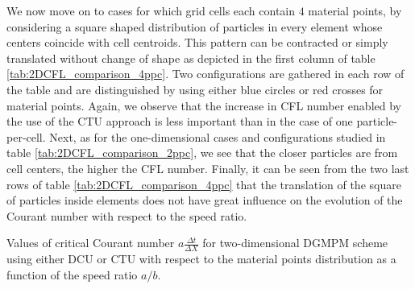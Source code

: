 We now move on to cases for which grid cells each contain $4$ material points, by considering a square shaped distribution of particles in every element whose centers coincide with cell centroids.
This pattern can be contracted or simply translated without change of shape as depicted in the first column of table \ref{tab:2DCFL_comparison_4ppc}.
Two configurations are gathered in each row of the table and are distinguished by using either blue circles or red crosses for material points.
Again, we observe that the increase in CFL number enabled by the use of the CTU approach is less important than in the case of one particle-per-cell.
Next, as for the one-dimensional cases and configurations studied in table \ref{tab:2DCFL_comparison_2ppc}, we see that the closer particles are from cell centers, the higher the CFL number.
Finally, it can be seen from the two last rows of table \ref{tab:2DCFL_comparison_4ppc} that the translation of the square of particles inside elements does not have great influence on the evolution of the Courant number with respect to the speed ratio. 
\begin{table}[h!]
  \centering
  
  \caption{Values of critical Courant number $a\frac{\Delta t}{\Delta X}$ for two-dimensional DGMPM scheme using either DCU or CTU with respect to the material points distribution as a function of the speed ratio $a/b$.}
  \label{tab:2DCFL_comparison_4ppc}
\end{table}




